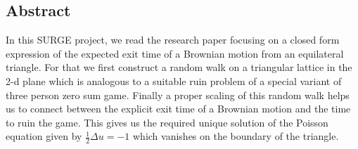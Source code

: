 \documentclass[a0,portrait]{a0poster}
\begin{document}
\begin{mdframed}[style=MyFrame]
\vspace{1cm}




\begin{multicols}{2} %



\section{Abstract}
In this SURGE project, we read the research paper \cite{MR2023644} focusing on a closed form expression of the expected exit time of a Brownian motion from an equilateral triangle. For that we first construct a random walk on a triangular lattice in the 2-d plane which is analogous to a suitable ruin problem of a special variant of three person zero sum game. Finally a proper scaling of this random walk helps us to connect between the explicit exit time of a Brownian motion and the time to ruin the game. This gives us the required unique solution of the Poisson equation given by $\frac{1}{2}\Delta u=-1$ which vanishes on the boundary of the triangle.



\end{multicols}
\end{mdframed}
\end{document}
